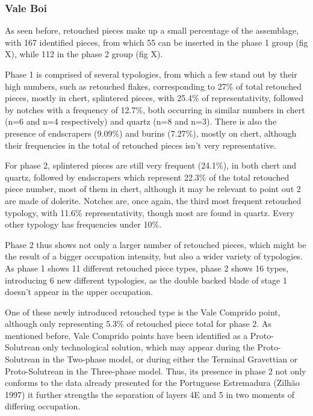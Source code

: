 \documentclass[12pt,twoside]{reedthesis}
\begin{document}
\hypertarget{vale-boi-6}{%
\subsubsection{Vale Boi}\label{vale-boi-6}}

As seen before, retouched pieces make up a small percentage of the assemblage, with 167 identified pieces, from which 55 can be inserted in the phase 1 group (fig X), while 112 in the phase 2 group (fig X).

Phase 1 is comprised of several typologies, from which a few stand out by their high numbers, such as retouched flakes, corresponding to 27\% of total retouched pieces, mostly in chert, splintered pieces, with 25.4\% of representativity, followed by notches with a frequency of 12.7\%, both occurring in similar numbers in chert (n=6 and n=4 respectively) and quartz (n=8 and n=3).
There is also the presence of endscrapers (9.09\%) and burins (7.27\%), mostly on chert, although their frequencies in the total of retouched pieces isn't very representative.

For phase 2, splintered pieces are still very frequent (24.1\%), in both chert and quartz, followed by endscrapers which represent 22.3\% of the total retouched piece number, most of them in chert, although it may be relevant to point out 2 are made of dolerite. Notches are, once again, the third most frequent retouched typology, with 11.6\% representativity, though most are found in quartz. Every other typology has frequencies under 10\%.

Phase 2 thus shows not only a larger number of retouched pieces, which might be the result of a bigger occupation intensity, but also a wider variety of typologies. As phase 1 shows 11 different retouched piece types, phase 2 shows 16 types, introducing 6 new different typologies, as the double backed blade of stage 1 doesn't appear in the upper occupation.

One of these newly introduced retouched type is the Vale Comprido point, although only representing 5.3\% of retouched piece total for phase 2. As mentioned before, Vale Comprido points have been identified as a Proto-Solutrean only technological solution, which may appear during the Proto-Solutrean in the Two-phase model, or during either the Terminal Gravettian or Proto-Solutrean in the Three-phase model. Thus, its presence in phase 2 not only conforms to the data already presented for the Portuguese Estremadura (Zilhão 1997) it further strengths the separation of layers 4E and 5 in two moments of differing occupation.
\end{document}
